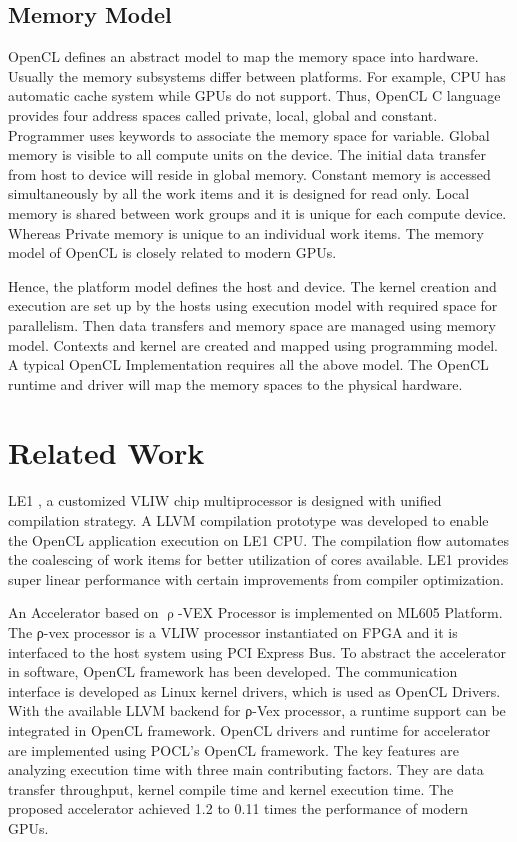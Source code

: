 \subsection{Memory Model}
OpenCL defines an abstract model to map the memory space into hardware. Usually the memory subsystems differ between platforms. For example, CPU has automatic cache system while GPUs do not support. Thus, OpenCL C language provides four address spaces called private, local, global and constant. Programmer uses keywords to associate the memory space for variable. Global memory is visible to all compute units on the device. The initial data transfer from host to device will reside in global memory. Constant memory is accessed simultaneously by all the work items and it is designed for read only. Local memory is shared between work groups and it is unique for each compute device. Whereas Private memory is unique to an individual work items. The memory model of OpenCL is closely related to modern GPUs.

Hence, the platform model defines the host and device. The kernel creation and execution are set up by the hosts using execution model with required space for parallelism. Then data transfers and memory space are managed using memory model. Contexts and kernel are created and mapped using programming model. A typical OpenCL Implementation requires all the above model. The OpenCL runtime and driver will map the memory spaces to the physical hardware.

\section{Related Work}
LE1 \cite{13}, a customized VLIW chip multiprocessor is designed with unified compilation strategy. A LLVM compilation prototype was developed to enable the OpenCL application execution on LE1 CPU. The compilation flow automates the coalescing of work items for better utilization of cores available. LE1 provides super linear performance with certain improvements from compiler optimization.

An Accelerator based on $\uprho$-VEX Processor \cite{14} is implemented on ML605 Platform. The ρ-vex processor is a VLIW processor instantiated on FPGA and it is interfaced to the host system using PCI Express Bus. To abstract the accelerator in software, OpenCL framework has been developed. The communication interface is developed as Linux kernel drivers, which is used as OpenCL Drivers. With the available LLVM backend for ρ-Vex processor, a runtime support can be integrated in OpenCL framework. OpenCL drivers and runtime for accelerator are implemented using POCL’s OpenCL framework. The key features are analyzing execution time with three main contributing factors. They are data transfer throughput, kernel compile time and kernel execution time. The proposed accelerator achieved 1.2 to 0.11 times the performance of modern GPUs.

